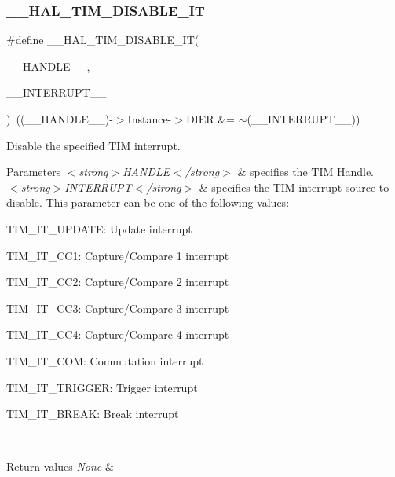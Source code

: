 \subsubsection{\texorpdfstring{\_\_HAL\_TIM\_DISABLE\_IT}{\_\_HAL\_TIM\_DISABLE\_IT}}
{\footnotesize\ttfamily \#define \+\_\+\+\_\+\+H\+A\+L\+\_\+\+T\+I\+M\+\_\+\+D\+I\+S\+A\+B\+L\+E\+\_\+\+IT(\begin{DoxyParamCaption}\item[{}]{\+\_\+\+\_\+\+H\+A\+N\+D\+L\+E\+\_\+\+\_\+,  }\item[{}]{\+\_\+\+\_\+\+I\+N\+T\+E\+R\+R\+U\+P\+T\+\_\+\+\_\+ }\end{DoxyParamCaption})~((\+\_\+\+\_\+\+H\+A\+N\+D\+L\+E\+\_\+\+\_\+)-\/$>$Instance-\/$>$D\+I\+ER \&= $\sim$(\+\_\+\+\_\+\+I\+N\+T\+E\+R\+R\+U\+P\+T\+\_\+\+\_\+))}



Disable the specified T\+IM interrupt. 


\begin{DoxyParams}{Parameters}
{\em $<$strong$>$\+H\+A\+N\+D\+L\+E$<$/strong$>$} & specifies the T\+IM Handle. \\
\hline
{\em $<$strong$>$\+I\+N\+T\+E\+R\+R\+U\+P\+T$<$/strong$>$} & specifies the T\+IM interrupt source to disable. This parameter can be one of the following values\+: \begin{DoxyItemize}
\item T\+I\+M\+\_\+\+I\+T\+\_\+\+U\+P\+D\+A\+TE\+: Update interrupt \item T\+I\+M\+\_\+\+I\+T\+\_\+\+C\+C1\+: Capture/\+Compare 1 interrupt \item T\+I\+M\+\_\+\+I\+T\+\_\+\+C\+C2\+: Capture/\+Compare 2 interrupt \item T\+I\+M\+\_\+\+I\+T\+\_\+\+C\+C3\+: Capture/\+Compare 3 interrupt \item T\+I\+M\+\_\+\+I\+T\+\_\+\+C\+C4\+: Capture/\+Compare 4 interrupt \item T\+I\+M\+\_\+\+I\+T\+\_\+\+C\+OM\+: Commutation interrupt \item T\+I\+M\+\_\+\+I\+T\+\_\+\+T\+R\+I\+G\+G\+ER\+: Trigger interrupt \item T\+I\+M\+\_\+\+I\+T\+\_\+\+B\+R\+E\+AK\+: Break interrupt \end{DoxyItemize}
\\
\hline
\end{DoxyParams}

\begin{DoxyRetVals}{Return values}
{\em None} & \\
\hline
\end{DoxyRetVals}
\mbox{\label{group___t_i_m___exported___macros_ga3e0ec4eb797b54c408a3be067f41a2f8}} 
